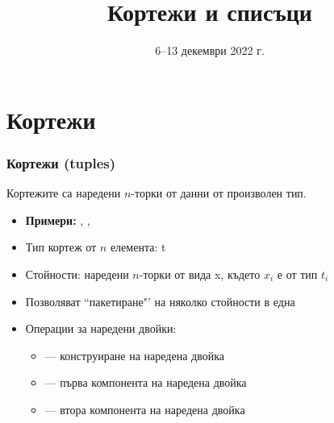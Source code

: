\documentclass[alsotrans]{beamerswitch}
\title{Кортежи и списъци}
\date{6--13 декември 2022 г.}
\begin{document}
\begin{frame}
  \titlepage
\end{frame}
\section{Кортежи}

\begin{frame}
  \frametitle{Кортежи (tuples)}

  Кортежите са наредени $n$-торки от данни от произволен тип.
  \begin{itemize}[<+->]
  \item \textbf{Примери:} , , 
  \item Тип кортеж от $n$ елемента: \tuple t
  \item Стойности: наредени $n$-торки от вида \tuple x, където $x_i$ е от тип $t_i$
  \item Позволяват ``пакетиране"' на няколко стойности в една
  \item Операции за наредени двойки:
    \begin{itemize}
    \item {} --- конструиране на наредена двойка
    \item {} --- първа компонента на наредена двойка
    \item {} --- втора компонента на наредена двойка
    \end{itemize}
  \end{itemize}
\end{frame}
\end{document}

